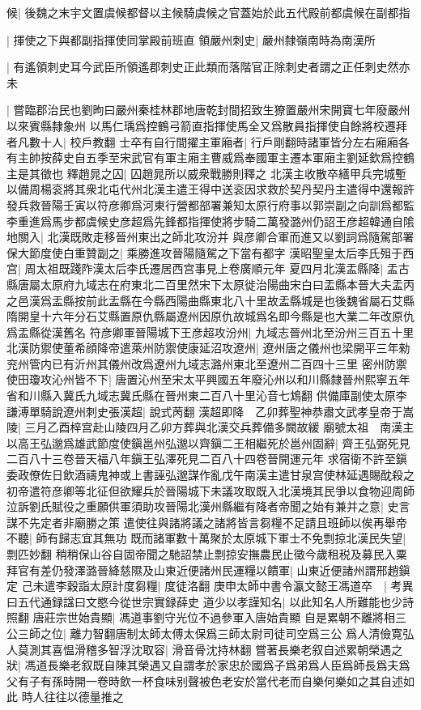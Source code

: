 候|{
	後魏之末宇文置虞候都督以主候騎虞候之官蓋始於此五代殿前都虞候在副都指}


|{
	揮使之下與都副指揮使同掌殿前班直}
領嚴州刺史|{
	嚴州隸嶺南時為南漢所}


|{
	有遙領刺史耳今武臣所領遙郡刺史正此類而落階官正除刺史者謂之正任刺史然亦未}


|{
	嘗臨郡治民也劉昫曰嚴州秦桂林郡地唐乾封間招致生獠置嚴州宋開寶七年廢嚴州以來賓縣隸象州}
以馬仁瑀爲控鶴弓箭直指揮使馬全又爲散員指揮使自餘將校遷拜者凡數十人|{
	校戶教翻}
士卒有自行間擢主軍廂者|{
	行戶剛翻時諸軍皆分左右廂廂各有主帥按薛史自五季至宋武官有軍主廂主曹威爲奉國軍主遷本軍廂主劉延欽爲控鶴主是其徵也}
釋趙晁之囚|{
	囚趙晁所以威衆戰勝則釋之}
北漢主收散卒繕甲兵完城塹以備周楊衮將其衆北屯代州北漢主遣王得中送衮因求救於契丹契丹主遣得中還報許發兵救晉陽壬寅以符彦卿爲河東行營都部署兼知太原行府事以郭崇副之向訓爲都監李重進爲馬步都虞候史彦超爲先鋒都指揮使將步騎二萬發潞州仍詔王彦超韓通自隂地關入|{
	北漢既敗走移晉州東出之師北攻汾并}
與彦卿合軍而進又以劉詞爲隨駕部署保大節度使白重贊副之|{
	乘勝進攻晉陽隨駕之下當有都字}
漢昭聖皇太后李氏殂于西宫|{
	周太祖既踐阼漢太后李氏遷居西宫事見上卷廣順元年}
夏四月北漢盂縣降|{
	盂古縣唐屬太原府九域志在府東北二百里然宋下太原徙治陽曲宋白曰盂縣本晉大夫盂丙之邑漢爲盂縣按前此盂縣在今縣西陽曲縣東北八十里故盂縣城是也後魏省屬石艾縣隋開皇十六年分石艾縣置原仇縣屬遼州因原仇故城爲名即今縣是也大業二年改原仇爲盂縣從漢舊名}
符彦卿軍晉陽城下王彦超攻汾州|{
	九域志晉州北至汾州三百五十里}
北漢防禦使董希顔降帝遣萊州防禦使康延沼攻遼州|{
	遼州唐之儀州也梁開平三年勑兖州管内已有沂州其儀州改爲遼州九域志潞州東北至遼州二百四十三里}
密州防禦使田瓊攻沁州皆不下|{
	唐置沁州至宋太平興國五年廢沁州以和川縣隸晉州熙寧五年省和川縣入冀氏九域志冀氏縣在晉州東二百八十里沁音七鴆翻}
供備庫副使太原李謙溥單騎說遼州刺史張漢超|{
	說式苪翻}
漢超即降　乙卯葬聖神恭肅文武孝皇帝于嵩陵|{
	三月乙酉梓宫赴山陵四月乙卯方葬與北漢交兵葬備多闕故緩}
廟號太祖　南漢主以高王弘邈爲雄武節度使鎭邕州弘邈以齊鎭二王相繼死於邕州固辭|{
	齊王弘弼死見二百八十三卷晉天福八年鎭王弘澤死見二百八十四卷晉開運元年}
求宿衛不許至鎭委政僚佐日飲酒禱鬼神或上書誣弘邈謀作亂戊午南漢主遣甘泉宫使林延遇賜酖殺之　初帝遣符彦卿等北征但欲耀兵於晉陽城下未議攻取既入北漢境其民爭以食物迎周師泣訴劉氏賦役之重願供軍須助攻晉陽北漢州縣繼有降者帝聞之始有兼并之意|{
	史言謀不先定者非廟勝之策}
遣使往與諸將議之諸將皆言芻糧不足請且班師以俟再舉帝不聽|{
	師有歸志宜其無功}
既而諸軍數十萬聚於太原城下軍士不免剽掠北漢民失望|{
	剽匹妙翻}
稍稍保山谷自固帝聞之馳詔禁止剽掠安撫農民止徵今歲租税及募民入粟拜官有差仍發澤潞晉絳慈隰及山東近便諸州民運糧以饋軍|{
	山東近便諸州謂邢趙鎭定}
己未遣李穀詣太原計度芻糧|{
	度徒洛翻}
庚申太師中書令瀛文懿王馮道卒　|{
	考異曰五代通録諡曰文愍今從世宗實録薛史}
道少以孝謹知名|{
	以此知名人所難能也少詩照翻}
唐莊宗世始貴顯|{
	馮道事劉守光位不過參軍入唐始貴顯}
自是累朝不離將相三公三師之位|{
	離力智翻唐制太師太傅太保爲三師太尉司徒司空爲三公}
爲人清儉寛弘人莫測其喜愠滑稽多智浮沈取容|{
	滑音骨沈持林翻}
嘗著長樂老叙自述累朝榮遇之狀|{
	馮道長樂老叙既自陳其榮遇又自謂孝於家忠於國爲子爲弟爲人臣爲師長爲夫爲父有子有孫時開一卷時飲一杯食味别聲被色老安於當代老而自樂何樂如之其自述如此}
時人往往以德量推之

